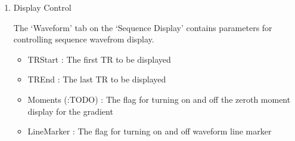 \documentclass{book}%
\begin{document}
\begin{enumerate}
The sequence display button group consists of :

\begin{itemize}
	\item Checker : The time checker toggle button
	\item Time Ruler : Display current time point according to the time checker
	\item $|<<$: Move sequence waveform to the beginning
	\item $<<<$ : Move sequence waveform backwards
	\item $>||<$ : Zoom out
	\item TR : Display a sequence waveform section with a time interval of TR
	\item ALL : Display all sequence waveform
	\item $<||>$ : Zoom in
	\item $>>>$: Move sequence waveform forwards
	\item $>>|$ : Move sequence waveform to the end
\end{itemize}

The user can use the `Checker' toggle button to display a sequence waveform at any arbitrary time interval (Figure \ref{fig:AllSequence}). First press the `Checker' button, move the mouse cursor into the axes. Notice that the mouse cursor changes to a cross-hair. Move the cross-hair in the axes, the amplitude value for each sequence line will be displayed accordingly on right side of each line with their default units. The user can click on the axes to choose one side of the time slot, then click on the another side. MRiLab will change the sequence view between the chosen time points, and also save time point information in the list at the bottom of this interface. To disable `Checker' function, simple press this button again.

\begin{figure}[htbp]
	\centering
		\texttt{[image: Pictures/AllSequence.eps]}
	\caption{A Sequence View with Multiple TRs.}
	\label{fig:AllSequence}
\end{figure}
	
	\item Display Control

The `Waveform' tab on the `Sequence Display' contains parameters for controlling sequence wavefrom display.

\begin{itemize}
	\item TRStart : The first TR to be displayed
	\item TREnd : The last TR to be displayed
	\item Moments (:TODO) : The flag for turning on and off the zeroth moment display for the gradient
	\item LineMarker : The flag for turning on and off waveform line marker
\end{itemize}	


\end{enumerate}
\end{document}
